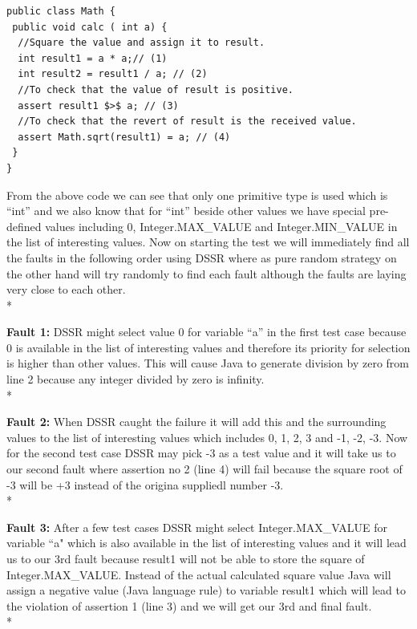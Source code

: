 \documentclass[10pt, conference, compsocconf]{IEEEtran}
\begin{document}
{\scriptsize
\begin{verbatim}
public class Math {
 public void calc ( int a) {
  //Square the value and assign it to result.
  int result1 = a * a;// (1)
  int result2 = result1 / a; // (2)
  //To check that the value of result is positive.
  assert result1 $>$ a; // (3)
  //To check that the revert of result is the received value.
  assert Math.sqrt(result1) = a; // (4)
 }
}
\end{verbatim}
}

From the above code we can see that only one primitive type is used which is ``int'' and we also know that for ``int'' beside other values we have special pre-defined values including 0, Integer.MAX\_VALUE and Integer.MIN\_VALUE in the list of interesting values. Now on starting the test we will immediately find all the faults in the following order using DSSR where as pure random strategy on the other hand will try randomly to find each fault although the faults are laying very close to each other.\\*



\textbf{Fault 1:} DSSR might select value 0 for variable ``a''  in the first test case because 0 is available in the list of interesting values and therefore its priority for selection is higher than other values. This will cause Java to generate division by zero from line 2 because any integer divided by zero is infinity.\\*

\textbf{Fault 2:} When DSSR caught the failure it will add this and the surrounding values to the list of interesting values which includes 0, 1, 2, 3 and -1, -2, -3. Now for the second test case DSSR may pick -3 as a test value and it will take us to our second fault where assertion no 2 (line 4) will fail because the square root of -3 will be +3 instead of the origina suppliedl number -3.\\*

\textbf{Fault 3:} After a few test cases DSSR might select Integer.MAX\_VALUE for variable ``a" which is also available in the list of interesting values and it will lead us to our 3rd fault because result1 will not be able to store the square of Integer.MAX\_VALUE. Instead of the actual calculated square value Java will assign a negative value (Java language rule) to variable result1 which will lead to the violation of assertion 1 (line 3) and we will get our 3rd and final fault.\\*
\end{document}
